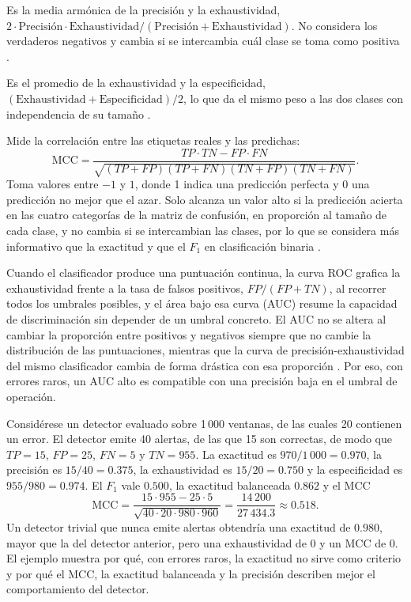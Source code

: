 Es la media armónica de la precisión y la exhaustividad, $2 \cdot \mathrm{Precisión} \cdot \mathrm{Exhaustividad} / (\mathrm{Precisión} + \mathrm{Exhaustividad})$. No considera los verdaderos negativos y cambia si se intercambia cuál clase se toma como positiva \cite{chicco2020_mcc}.

Es el promedio de la exhaustividad y la especificidad, $(\mathrm{Exhaustividad} + \mathrm{Especificidad})/2$, lo que da el mismo peso a las dos clases con independencia de su tamaño \cite{diallo2025_metrics}.

Mide la correlación entre las etiquetas reales y las predichas:
\begin{equation}
\mathrm{MCC} = \frac{TP \cdot TN - FP \cdot FN}{\sqrt{(TP+FP)(TP+FN)(TN+FP)(TN+FN)}}.
\end{equation}
Toma valores entre $-1$ y $1$, donde 1 indica una predicción perfecta y 0 una predicción no mejor que el azar. Solo alcanza un valor alto si la predicción acierta en las cuatro categorías de la matriz de confusión, en proporción al tamaño de cada clase, y no cambia si se intercambian las clases, por lo que se considera más informativo que la exactitud y que el $F_1$ en clasificación binaria \cite{chicco2020_mcc}.

Cuando el clasificador produce una puntuación continua, la curva ROC grafica la exhaustividad frente a la tasa de falsos positivos, $FP/(FP + TN)$, al recorrer todos los umbrales posibles, y el área bajo esa curva (AUC) resume la capacidad de discriminación sin depender de un umbral concreto. El AUC no se altera al cambiar la proporción entre positivos y negativos siempre que no cambie la distribución de las puntuaciones, mientras que la curva de precisión-exhaustividad del mismo clasificador cambia de forma drástica con esa proporción \cite{richardson2024_roc}. Por eso, con errores raros, un AUC alto es compatible con una precisión baja en el umbral de operación.

Considérese un detector evaluado sobre 1\,000 ventanas, de las cuales 20 contienen un error. El detector emite 40 alertas, de las que 15 son correctas, de modo que $TP = 15$, $FP = 25$, $FN = 5$ y $TN = 955$. La exactitud es $970/1\,000 = 0.970$, la precisión es $15/40 = 0.375$, la exhaustividad es $15/20 = 0.750$ y la especificidad es $955/980 = 0.974$. El $F_1$ vale $0.500$, la exactitud balanceada $0.862$ y el MCC
\begin{equation}
\mathrm{MCC} = \frac{15 \cdot 955 - 25 \cdot 5}{\sqrt{40 \cdot 20 \cdot 980 \cdot 960}} = \frac{14\,200}{27\,434.3} \approx 0.518.
\end{equation}
Un detector trivial que nunca emite alertas obtendría una exactitud de $0.980$, mayor que la del detector anterior, pero una exhaustividad de 0 y un MCC de 0. El ejemplo muestra por qué, con errores raros, la exactitud no sirve como criterio y por qué el MCC, la exactitud balanceada y la precisión describen mejor el comportamiento del detector.

